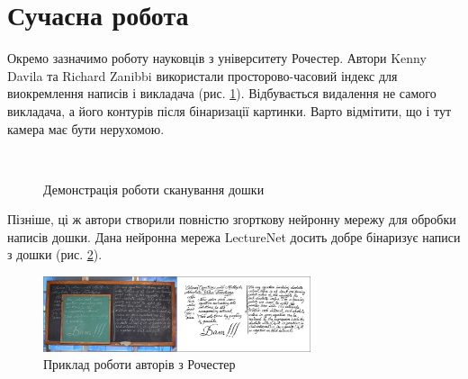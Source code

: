 \section{Сучасна робота}
Окремо зазначимо роботу \cite{davila:2017}
науковців з університету Рочестер. Автори Kenny Davila та Richard Zanibbi
використали просторово-часовий індекс для виокремлення написів і викладача (рис. \ref{fig:davila:2017}).
Відбувається видалення не самого викладача,  а його контурів після бінаризації картинки.
Варто відмітити, що і тут камера має бути нерухомою.
\begin{figure}[H]
  \centering
  \\
  \caption{Демонстрація роботи сканування дошки \cite{davila:2017}
    \label{fig:davila:2017}
  }
\end{figure}
Пізніше, ці ж автори створили повністю згорткову нейронну мережу \cite{davila:2021}
для обробки написів дошки. Дана нейронна мережа LectureNet досить добре бінаризує написи з дошки
(рис. \ref{fig:davila:2021}).
\begin{figure}[H]
  \centering
  \includegraphics[width=0.7\textwidth]{images/davila_2021}
  \caption{Приклад роботи авторів з Рочестер \cite{davila:2021}} 
  \label{fig:davila:2021}
\end{figure}

\clearpage
